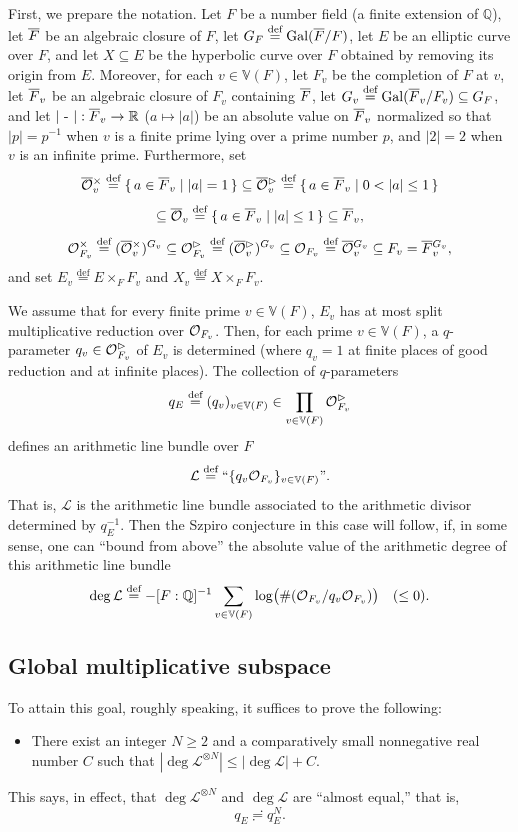 \documentclass[12pt, reqno, a4paper]{amsart}
\def\eqdef{\stackrel{\textrm{def}}{=}} %
\def\bQ{\mathbb{Q}} %
\def\bR{\mathbb{R}} %
\def\bV{\mathbb{V}}
\def\cL{{\mathcal{L}}}
\DeclareMathOperator{\Gal}{Gal}
\begin{document}
First, we prepare the notation.
Let $F$ be a number field (a finite extension of $\bQ$), let $\oF$ be an algebraic closure of $F$, let $\GG_F \eqdef \Gal(\oF/F)$, let $E$ be an elliptic curve over $F$, and let $X \subseteq E$ be the hyperbolic curve over $F$ obtained by removing its origin from $E$.
Moreover, for each $v \in \bV(F)$, let $F_v$ be the completion of $F$ at $v$, let $\oF_v$ be an algebraic closure of $F_v$ containing $\oF$, let $\GG_v \eqdef \Gal(\oF_v/F_v) \subseteq \GG_F$, and let $|\text{ - }|: \oF_v \to \bR$ ($a \mapsto |a|$) be an absolute value on $\oF_v$ normalized so that $|p|=p^{-1}$ when $v$ is a finite prime lying over a prime number $p$, and $|2|=2$ when $v$ is an infinite prime.
Furthermore, set
\[
\oOOx_v \eqdef \{\,a \in \oF_v \mid |a|=1\,\} \subseteq
\oOOt_v \eqdef \{\,a \in \oF_v \mid 0<|a|\leq 1\,\}
\]
\[
\subseteq \oOO_v \eqdef \{\,a \in \oF_v \mid |a|\leq 1\,\} \subseteq \oF_v,
\]
\[
\OOx_{F_v} \eqdef (\oOOx_v)^{\GG_v} \subseteq
\OOt_{F_v} \eqdef (\oOOt_v)^{\GG_v} \subseteq
\OO_{F_v} \eqdef \oOO_v^{\GG_v} \subseteq F_v = \oF_v^{\GG_v},
\]
and set $E_v \eqdef E \times_F F_v$ and $X_v \eqdef X \times_F F_v$.

We assume that for every finite prime $v \in \bV(F)$, $E_v$ has at most split multiplicative reduction over $\OO_{F_v}$.
Then, for each prime $v \in \bV(F)$, a $q$-parameter $q_v \in \OOt_{F_v}$ of $E_v$ is determined (where $q_v=1$ at finite places of good reduction and at infinite places).
The collection of $q$-parameters
\[
q_E \eqdef (q_v)_{v\in \bV(F)} \in \prod_{v\in \bV(F)} \OOt_{F_v}
\]
defines an arithmetic line bundle over $F$
\[
\cL \eqdef \text{``}\{q_v\OO_{F_v}\}_{v\in \bV(F)}\text{''}.
\]
That is, $\cL$ is the arithmetic line bundle associated to the arithmetic divisor determined by $q_E^{-1}$.
Then the Szpiro conjecture in this case will follow, if, in some sense, one can ``bound from above'' the absolute value of the arithmetic degree of this arithmetic line bundle
\[
\deg \cL \eqdef -[F:\bQ]^{-1}\sum_{v\in \bV(F)} \log\bigl(\#(\OO_{F_v}/q_v\OO_{F_v})\bigr) \quad (\leq 0).
\]

\subsection{Global multiplicative subspace}\label{sub:GMS}
To attain this goal, roughly speaking, it suffices to prove the following:
\begin{itemize}
\item[$(\ast)$] There exist an integer $N\geq 2$ and a comparatively small nonnegative real number $C$ such that $|\deg \cL^{\otimes N}| \leq |\deg \cL|+C$.
\end{itemize}
This says, in effect, that $\deg \cL^{\otimes N}$ and $\deg \cL$ are ``almost equal,'' that is,
$$
q_E\risingdotseq q^N_E.
$$
\end{document}
